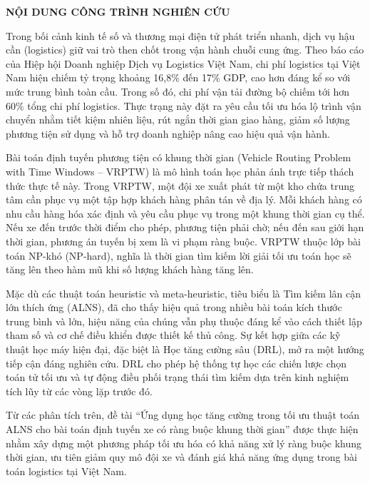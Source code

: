 \documentclass[13pt,a4paper]{extarticle}
\begin{document}
\clearpage
\begin{center}
    {\bfseries\fontsize{16pt}{20pt}\selectfont NỘI DUNG CÔNG TRÌNH NGHIÊN CỨU\par}
\end{center}

Trong bối cảnh kinh tế số và thương mại điện tử phát triển nhanh, dịch vụ hậu cần (logistics) giữ vai trò then chốt trong vận hành chuỗi cung ứng. Theo báo cáo của Hiệp hội Doanh nghiệp Dịch vụ Logistics Việt Nam, chi phí logistics tại Việt Nam hiện chiếm tỷ trọng khoảng 16,8\% đến 17\% GDP, cao hơn đáng kể so với mức trung bình toàn cầu. Trong số đó, chi phí vận tải đường bộ chiếm tới hơn 60\% tổng chi phí logistics. Thực trạng này đặt ra yêu cầu tối ưu hóa lộ trình vận chuyển nhằm tiết kiệm nhiên liệu, rút ngắn thời gian giao hàng, giảm số lượng phương tiện sử dụng và hỗ trợ doanh nghiệp nâng cao hiệu quả vận hành.

Bài toán định tuyến phương tiện có khung thời gian (Vehicle Routing Problem with Time Windows -- VRPTW) là mô hình toán học phản ánh trực tiếp thách thức thực tế này. Trong VRPTW, một đội xe xuất phát từ một kho chứa trung tâm cần phục vụ một tập hợp khách hàng phân tán về địa lý. Mỗi khách hàng có nhu cầu hàng hóa xác định và yêu cầu phục vụ trong một khung thời gian cụ thể. Nếu xe đến trước thời điểm cho phép, phương tiện phải chờ; nếu đến sau giới hạn thời gian, phương án tuyến bị xem là vi phạm ràng buộc. VRPTW thuộc lớp bài toán NP-khó (NP-hard), nghĩa là thời gian tìm kiếm lời giải tối ưu toán học sẽ tăng lên theo hàm mũ khi số lượng khách hàng tăng lên.

Mặc dù các thuật toán heuristic và meta-heuristic, tiêu biểu là Tìm kiếm lân cận lớn thích ứng (ALNS), đã cho thấy hiệu quả trong nhiều bài toán kích thước trung bình và lớn, hiệu năng của chúng vẫn phụ thuộc đáng kể vào cách thiết lập tham số và cơ chế điều khiển được thiết kế thủ công. Sự kết hợp giữa các kỹ thuật học máy hiện đại, đặc biệt là Học tăng cường sâu (DRL), mở ra một hướng tiếp cận đáng nghiên cứu. DRL cho phép hệ thống tự học các chiến lược chọn toán tử tối ưu và tự động điều phối trạng thái tìm kiếm dựa trên kinh nghiệm tích lũy từ các vòng lặp trước đó.

Từ các phân tích trên, đề tài ``Ứng dụng học tăng cường trong tối ưu thuật toán ALNS cho bài toán định tuyến xe có ràng buộc khung thời gian'' được thực hiện nhằm xây dựng một phương pháp tối ưu hóa có khả năng xử lý ràng buộc khung thời gian, ưu tiên giảm quy mô đội xe và đánh giá khả năng ứng dụng trong bài toán logistics tại Việt Nam.
\end{document}
